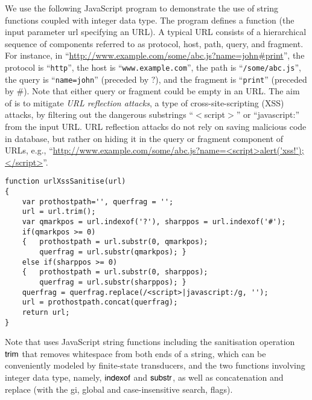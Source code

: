 
\begin{example}\label{exmp:running}
We use the following JavaScript program to demonstrate the use of string functions coupled with integer data type.
The program defines a function {\urlxsssanitise} (the input parameter url specifying an URL). A typical URL consists of a hierarchical sequence of components referred to as protocol, host, path, query, and fragment. For instance, in ``\url{http://www.example.com/some/abc.js?name=john#print}'', the protocol is ``{\tt http}'', the host is ``{\tt www.example.com}'', the path is ``{\tt /some/abc.js}'', the query is ``{\tt name=john}'' (preceded by $?$), and the fragment is ``{\tt print}'' (preceded by $\#$). Note that either query or fragment could be empty in an URL. The aim of {\urlxsssanitise} is to mitigate \emph{URL reflection attacks}, a type of cross-site-scripting (XSS) attacks, by filtering out the dangerous substrings ``$<$script$>$'' or ``javascript:'' from the input URL. URL reflection attacks  do not rely on saving malicious code in database, but rather on hiding it in the query or fragment component of URLs, e.g., ``\url{http://www.example.com/some/abc.js?name=<script>alert('xss!');</script>}''.
{\small
\begin{verbatim}
function urlXssSanitise(url)
{
    var prothostpath='', querfrag = '';
    url = url.trim();
    var qmarkpos = url.indexof('?'), sharppos = url.indexof('#');
    if(qmarkpos >= 0) 
    {   prothostpath = url.substr(0, qmarkpos);
        querfrag = url.substr(qmarkpos); }
    else if(sharppos >= 0)
    {   prothostpath = url.substr(0, sharppos);
        querfrag = url.substr(sharppos); }
    querfrag = querfrag.replace(/<script>|javascript:/g, '');
    url = prothostpath.concat(querfrag);
    return url;
}
\end{verbatim}
}
%
Note that {\urlxsssanitise} uses JavaScript string functions including the sanitisation operation $\sf trim$ that removes whitespace from both ends of a string, which can be conveniently modeled by finite-state transducers, and the two functions involving integer data type, namely, $\sf indexof$ and $\sf substr$, as well as concatenation and replace (with the gi, global and case-insensitive search, flags).



\end{example}

